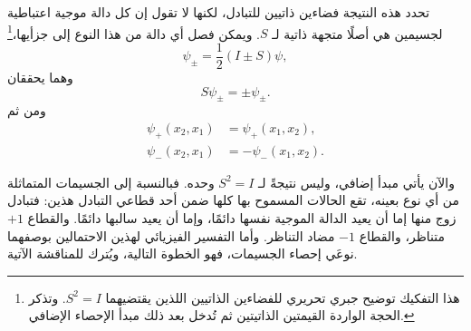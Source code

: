 تحدد هذه النتيجة فضاءين ذاتيين للتبادل، لكنها لا تقول إن كل دالة موجية اعتباطية لجسيمين هي أصلًا متجهة ذاتية لـ \(S\). ويمكن فصل أي دالة من هذا النوع إلى جزأيها،\footnote{هذا التفكيك توضيح جبري تحريري للفضاءين الذاتيين اللذين يقتضيهما \(S^{2}=I\). وتذكر الحجة الواردة القيمتين الذاتيتين ثم تُدخل بعد ذلك مبدأ الإحصاء الإضافي.}
\begin{equation}
\psi_{\pm}=\frac12(I\pm S)\psi,
\end{equation}
وهما يحققان
\begin{equation}
S\psi_{\pm}=\pm\psi_{\pm}.
\end{equation}
ومن ثم
\begin{align}
\psi_{+}(x_{2},x_{1})&=\psi_{+}(x_{1},x_{2}),\\
\psi_{-}(x_{2},x_{1})&=-\psi_{-}(x_{1},x_{2}).
\end{align}

والآن يأتي مبدأ إضافي، وليس نتيجةً لـ \(S^{2}=I\) وحده. فبالنسبة إلى الجسيمات المتماثلة من أي نوع بعينه، تقع الحالات المسموح بها كلها ضمن أحد قطاعي التبادل هذين: فتبادل زوج منها إما أن يعيد الدالة الموجية نفسها دائمًا، وإما أن يعيد سالبها دائمًا. والقطاع \(+1\) متناظر، والقطاع \(-1\) مضاد التناظر. وأما التفسير الفيزيائي لهذين الاحتمالين بوصفهما نوعَي إحصاء الجسيمات، فهو الخطوة التالية، ويُترك للمناقشة الآتية.
